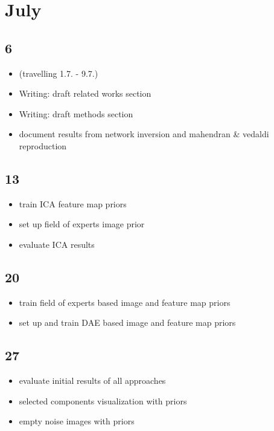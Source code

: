 \documentclass{article}
\begin{document}
\section*{July}

\subsection*{6}

\begin{itemize}
	\item (travelling 1.7. - 9.7.)
	\item Writing: draft related works section
	\item Writing: draft methods section
	\item document results from network inversion and mahendran \& vedaldi reproduction
\end{itemize}

\subsection*{13}

\begin{itemize}
	\item train ICA feature map priors
	\item set up field of experts image prior
	\item evaluate ICA results
\end{itemize}

\subsection*{20}

\begin{itemize}
	\item train field of experts based image and feature map priors
	\item set up and train DAE based image and feature map priors
\end{itemize}

\subsection*{27}

\begin{itemize}
	\item evaluate initial results of all approaches
	\item selected components visualization with priors
	\item empty noise images with priors
\end{itemize}
\end{document}
